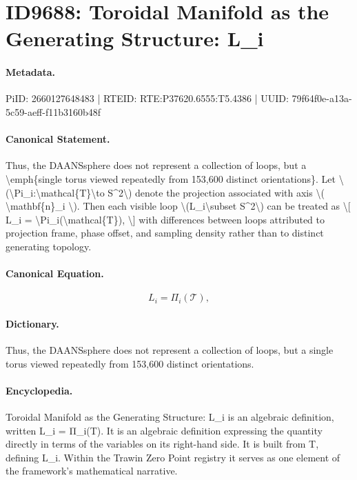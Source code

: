 \section*{ID9688: Toroidal Manifold as the Generating Structure: L\_i}
\paragraph{Metadata.}
PiID: 2660127648483 | RTEID: RTE:P37620.6555:T5.4386 | UUID: 79f64f0e-a13a-5c59-aeff-f11b3160b48f

\paragraph{Canonical Statement.}
Thus, the DAANSsphere does not represent a collection of loops, but a \textbackslash{}emph\{single torus viewed repeatedly from 153,600 distinct orientations\}. Let \textbackslash{}(\textbackslash{}Pi\_i:\textbackslash{}mathcal\{T\}\textbackslash{}to S\textasciicircum{}2\textbackslash{}) denote the projection associated with axis \textbackslash{}( \textbackslash{}mathbf\{n\}\_i \textbackslash{}). Then each visible loop \textbackslash{}(L\_i\textbackslash{}subset S\textasciicircum{}2\textbackslash{}) can be treated as \textbackslash{}[ L\_i = \textbackslash{}Pi\_i(\textbackslash{}mathcal\{T\}), \textbackslash{}] with differences between loops attributed to projection frame, phase offset, and sampling density rather than to distinct generating topology.

\paragraph{Canonical Equation.}
\[
L_i = \Pi_i(\mathcal{T}),
\]

\paragraph{Dictionary.}
Thus, the DAANSsphere does not represent a collection of loops, but a single torus viewed repeatedly from 153,600 distinct orientations.

\paragraph{Encyclopedia.}
Toroidal Manifold as the Generating Structure: L\_i is an algebraic definition, written L\_i = Π\_i(T). It is an algebraic definition expressing the quantity directly in terms of the variables on its right-hand side. It is built from T, defining L\_i. Within the Trawin Zero Point registry it serves as one element of the framework's mathematical narrative.
